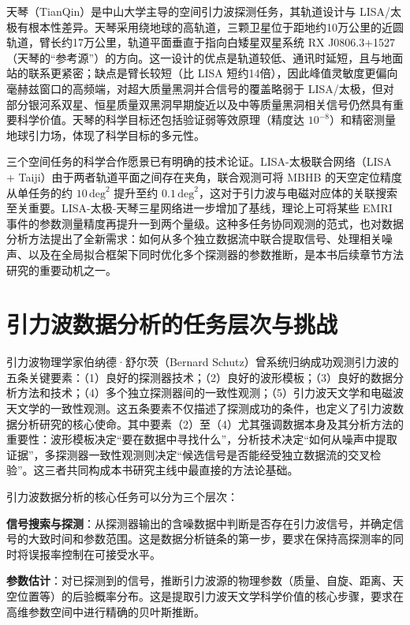 天琴（TianQin）是中山大学主导的空间引力波探测任务，其轨道设计与 LISA/太极有根本性差异。天琴采用绕地球的高轨道，三颗卫星位于距地约10万公里的近圆轨道，臂长约17万公里，轨道平面垂直于指向白矮星双星系统 RX J0806.3+1527（天琴的“参考源”）的方向。这一设计的优点是轨道较低、通讯时延短，且与地面站的联系更紧密；缺点是臂长较短（比 LISA 短约14倍），因此峰值灵敏度更偏向毫赫兹窗口的高频端，对超大质量黑洞并合信号的覆盖略弱于 LISA/太极，但对部分银河系双星、恒星质量双黑洞早期旋近以及中等质量黑洞相关信号仍然具有重要科学价值。天琴的科学目标还包括验证弱等效原理（精度达 $10^{-8}$）和精密测量地球引力场，体现了科学目标的多元性。

三个空间任务的科学合作愿景已有明确的技术论证。LISA-太极联合网络（LISA + Taiji）由于两者轨道平面之间存在夹角，联合观测可将 MBHB 的天空定位精度从单任务的约 $10\,\text{deg}^2$ 提升至约 $0.1\,\text{deg}^2$，这对于引力波与电磁对应体的关联搜索至关重要。LISA-太极-天琴三星网络进一步增加了基线，理论上可将某些 EMRI 事件的参数测量精度再提升一到两个量级。这种多任务协同观测的范式，也对数据分析方法提出了全新需求：如何从多个独立数据流中联合提取信号、处理相关噪声、以及在全局拟合框架下同时优化多个探测器的参数推断，是本书后续章节方法研究的重要动机之一。

\section{引力波数据分析的任务层次与挑战}

引力波物理学家伯纳德·舒尔茨（Bernard Schutz）曾系统归纳成功观测引力波的五条关键要素：（1）良好的探测器技术；（2）良好的波形模板；（3）良好的数据分析方法和技术；（4）多个独立探测器间的一致性观测；（5）引力波天文学和电磁波天文学的一致性观测。这五条要素不仅描述了探测成功的条件，也定义了引力波数据分析研究的核心使命。其中要素（2）至（4）尤其强调数据本身及其分析方法的重要性：波形模板决定“要在数据中寻找什么”，分析技术决定“如何从噪声中提取证据”，多探测器一致性观测则决定“候选信号是否能经受独立数据流的交叉检验”。这三者共同构成本书研究主线中最直接的方法论基础。

引力波数据分析的核心任务可以分为三个层次：

\textbf{信号搜索与探测}：从探测器输出的含噪数据中判断是否存在引力波信号，并确定信号的大致时间和参数范围。这是数据分析链条的第一步，要求在保持高探测率的同时将误报率控制在可接受水平。

\textbf{参数估计}：对已探测到的信号，推断引力波源的物理参数（质量、自旋、距离、天空位置等）的后验概率分布。这是提取引力波天文学科学价值的核心步骤，要求在高维参数空间中进行精确的贝叶斯推断。


